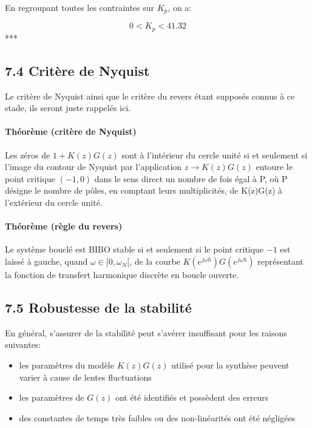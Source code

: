 \documentclass[11pt]{article}
\providecommand{\tightlist}{%
      \setlength{\itemsep}{0pt}\setlength{\parskip}{0pt}}
\begin{document}
    En regroupant toutes les contraintes sur \(K_p\), on a:

\[ 0 < K_p < 41.32 \] ***

    \subsection{7.4 Critère de Nyquist}\label{crituxe8re-de-nyquist}

    Le critère de Nyquist ainsi que le critère du revers étant supposés
connus à ce stade, ils seront juste rappelés ici.

    \paragraph{Théorème (critère de
Nyquist)}\label{thuxe9oruxe8me-crituxe8re-de-nyquist}

Les zéros de \(1+K(z)G(z)\) sont à l'intérieur du cercle unité si et
seulement si l'image du contour de Nyquist par l'application
\(z \rightarrow K(z)G(z)\) entoure le point critique \((-1, 0)\) dans le
sens direct un nombre de fois égal à P, où P désigne le nombre de pôles,
en comptant leurs multiplicités, de K(z)G(z) à l'extérieur du cercle
unité.

    \paragraph{Théorème (règle du
revers)}\label{thuxe9oruxe8me-ruxe8gle-du-revers}

Le système bouclé est BIBO stable si et seulement si le point critique
\(-1\) est laissé à gauche, quand \(\omega \in [0, \omega_N[\), de la
courbe \(K(e^{j\omega h})G(e^{j\omega h})\) représentant la fonction de
transfert harmonique discrète en boucle ouverte.

    \subsection{7.5 Robustesse de la
stabilité}\label{robustesse-de-la-stabilituxe9}

    En général, s'assurer de la stabilité peut s'avérer insuffisant pour les
raisons suivantes:

\begin{itemize}
\tightlist
\item
  les paramètres du modèle \(K(z)G(z)\) utilisé pour la synthèse peuvent
  varier à cause de lentes fluctuations
\item
  les paramètres de \(G(z)\) ont été identifiés et possèdent des erreurs
\item
  des constantes de temps très faibles ou des non-linéarités ont été
  négligées
\end{itemize}
\end{document}
